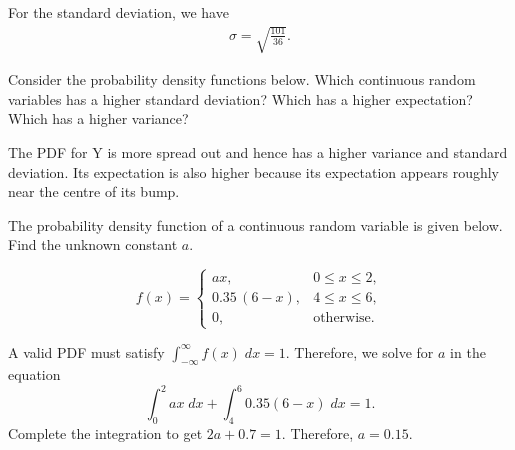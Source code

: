 \documentclass[../main.tex]{subfiles}
\begin{document}
\begin{exercise}
\begin{solution}
\begin{itemize}
        For the standard deviation, we have
        \begin{align*}
          \sigma = \sqrt{\frac{101}{36}}.
        \end{align*}
    \end{itemize}
  \end{solution}
\end{exercise}

\begin{exercise}
  Consider the probability density functions below. Which continuous random variables has a higher standard deviation? Which has a higher expectation? Which has a higher variance?


  \begin{solution}
    The PDF for Y is more spread out and hence has a higher variance and standard deviation.  Its expectation is also higher because its expectation appears roughly near the centre of its bump.
  \end{solution}
\end{exercise}

\begin{exercise}
  The probability density function of a continuous random variable is given below. Find the unknown constant \(a\).

  \[
    f(x) =
    \begin{cases}
      a x, & 0 \le x \le 2, \\[8pt]
      0.35\, (6 - x), & 4 \le x \le 6, \\[8pt]
      0, & \text{otherwise}.
    \end{cases}
  \]

  \begin{solution}
    A valid PDF must satisfy \(\int_{-\infty}^{\infty} f(x) \;dx = 1\). Therefore,  we solve for \(a\) in the equation
    \[
      \int_{0}^{2} ax \;dx + \int_{4}^{6} 0.35 (6 - x) \;dx = 1.
    \]
    Complete the integration to get \(2a + 0.7 = 1\). Therefore, \(a = 0.15\).
  \end{solution}
\end{exercise}
\end{document}
